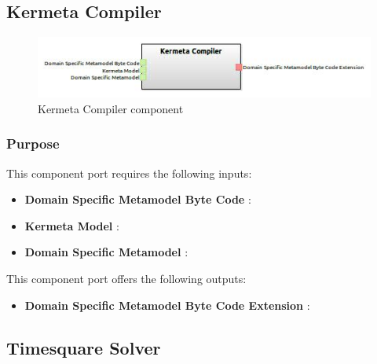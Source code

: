 \documentclass{gemoc} %
\begin{document}
\subsection{Kermeta Compiler}

\begin{figure}[htp]
	\begin{center}
	\includegraphics*[trim=0.0cm 0.0cm 0cm 0.0cm, clip=true, scale=1.0]{../images/generated/Generated_Kermeta Compiler.jpg}
	\caption{Kermeta Compiler component}
	\end{center}
\end{figure}

\subsubsection{Purpose}

This component port requires the following inputs:
\begin{itemize}
  \item \textbf{Domain Specific Metamodel Byte Code} :
  \item \textbf{Kermeta Model} :
  \item \textbf{Domain Specific Metamodel} :
\end{itemize}

This component port offers the following outputs:
\begin{itemize}
  \item \textbf{Domain Specific Metamodel Byte Code Extension} :
\end{itemize}

\subsection{Timesquare Solver}
\end{document}
